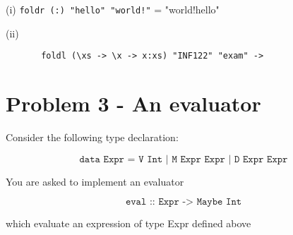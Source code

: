 \documentclass{article}
\begin{document}
    (i) \texttt{foldr (:) "hello" "world!"} = "world!hello"
    \medskip

    (ii) 
    \begin{lstlisting}
       foldl (\xs -> \x -> x:xs) "INF122" "exam" -> 
    \end{lstlisting}

    \section{Problem 3 - An evaluator}
    Consider the following type declaration:

    \[ \texttt{data Expr = V Int | M Expr Expr | D Expr Expr} \]

    You are asked to implement an evaluator

    \[ \texttt{eval :: Expr -> Maybe Int} \]

    which evaluate an expression of type Expr defined above
\end{document}
